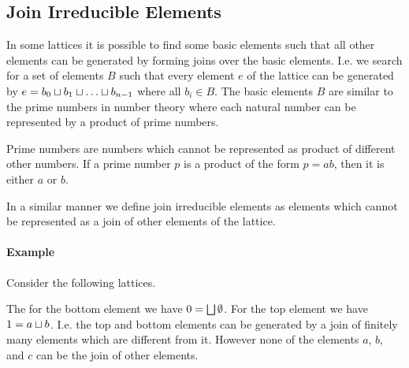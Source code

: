\subsection{Join Irreducible Elements}


In some lattices it is possible to find some basic elements such that all other
elements can be generated by forming joins over the basic elements. I.e. we search
for a set of elements $B$ such that every element $e$ of the lattice can be
generated by $e = b_0 \sqcup b_1 \sqcup \ldots \sqcup b_{n-1}$ where all $b_i \in
B$. The basic elements $B$ are similar to the prime numbers in number theory
where each natural number can be represented by a product of prime numbers.

Prime numbers are numbers which cannot be represented as product of different
other numbers. If a prime number $p$ is a product of the form $p = ab$, then it
is either $a$ or $b$.

In a similar manner we define join irreducible elements as elements which cannot be
represented as a join of other elements of the lattice.

\paragraph{Example} Consider the following lattices.

%

The for the bottom element we have $0 = \bigsqcup \emptyset$. For the top element
we have $1 = a \sqcup b$. I.e. the top and bottom elements can be generated by a
join of finitely many elements which are different from it. However none of the
elements $a$, $b$, and $c$ can be the join of other elements.



